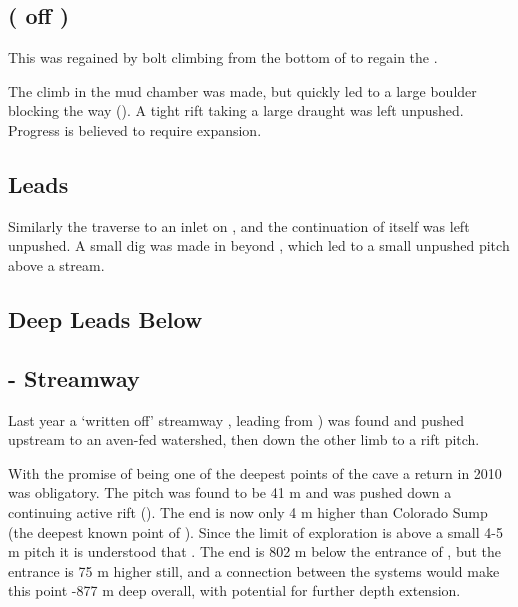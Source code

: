 \subsection{ ( off )}

This was regained by bolt climbing from the bottom of  to regain the .

The climb in the mud chamber was made, but quickly led to a large boulder blocking the way (). A tight rift taking a large draught was left unpushed. Progress is believed to require expansion.

\subsection{ Leads}

Similarly the traverse to an inlet on , and the continuation of  itself was left unpushed. A small dig was made in  beyond , which led to a small unpushed pitch above a stream.

\subsection{Deep Leads Below }

\subsection{ - 
Streamway}

Last year a `written off' streamway , leading from
) was found and pushed upstream to an aven-fed watershed, then down the other limb to a rift pitch.

With the promise of being one of the deepest points of the cave a return in 2010 was obligatory. The pitch was found to be 41 m and was pushed down a continuing active rift (). The end is now only 4 m higher than Colorado Sump (the deepest known point of ).
Since the limit of exploration is above a small 4-5 m pitch it is understood that . The end is 802 m below the entrance of , but the
 entrance is 75 m higher still, and a connection between the systems would make this point -877 m deep overall, with
potential for further depth extension.

